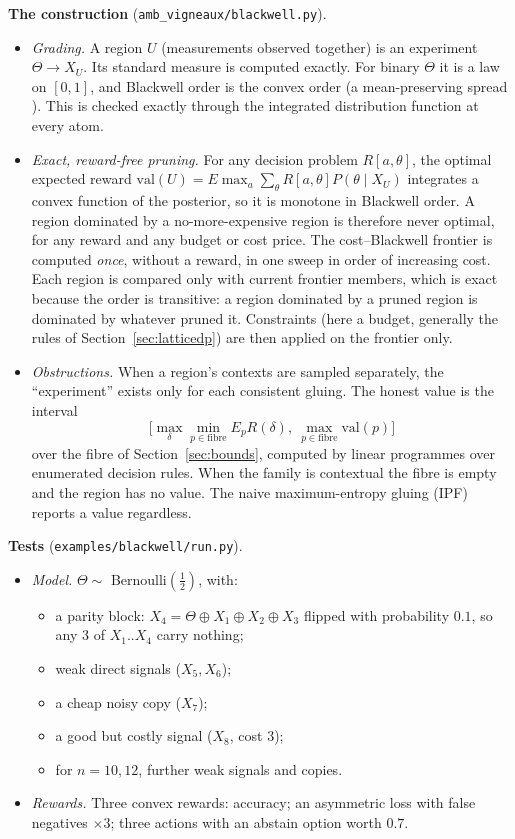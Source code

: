 \documentclass[11pt]{article}
\theoremstyle{definition}
\theoremstyle{remark}
\begin{document}
\textbf{The construction} (\texttt{amb\_vigneaux/blackwell.py}).
\begin{itemize}
  \item \emph{Grading.} A region $U$ (measurements observed together) is an experiment $\Theta\to X_U$. Its standard measure is computed exactly. For binary $\Theta$ it is a law on $[0,1]$, and Blackwell order is the convex order (a mean-preserving spread \cite{rothschildstiglitz70}). This is checked exactly through the integrated distribution function at every atom.
  \item \emph{Exact, reward-free pruning.} For any decision problem $R[a,\theta]$, the optimal expected reward $\mathrm{val}(U)=E\max_a\sum_\theta R[a,\theta]P(\theta\mid X_U)$ integrates a convex function of the posterior, so it is monotone in Blackwell order. A region dominated by a no-more-expensive region is therefore never optimal, for any reward and any budget or cost price. The cost--Blackwell frontier is computed \emph{once}, without a reward, in one sweep in order of increasing cost. Each region is compared only with current frontier members, which is exact because the order is transitive: a region dominated by a pruned region is dominated by whatever pruned it. Constraints (here a budget, generally the rules of Section~\ref{sec:latticedp}) are then applied on the frontier only.
  \item \emph{Obstructions.} When a region's contexts are sampled separately, the ``experiment'' exists only for each consistent gluing. The honest value is the interval
  \[ \bigl[\max_\delta\min_{p\in\text{fibre}}E_p R(\delta),\ \max_{p\in\text{fibre}}\mathrm{val}(p)\bigr] \]
  over the fibre of Section~\ref{sec:bounds}, computed by linear programmes over enumerated decision rules. When the family is contextual the fibre is empty and the region has no value. The naive maximum-entropy gluing (IPF) reports a value regardless.
\end{itemize}

\textbf{Tests} (\texttt{examples/blackwell/run.py}).
\begin{itemize}
  \item \emph{Model.} $\Theta\sim$ Bernoulli$(\tfrac12)$, with:
  \begin{itemize}
    \item a parity block: $X_4=\Theta\oplus X_1\oplus X_2\oplus X_3$ flipped with probability $0.1$, so any $3$ of $X_1..X_4$ carry nothing;
    \item weak direct signals ($X_5,X_6$);
    \item a cheap noisy copy ($X_7$);
    \item a good but costly signal ($X_8$, cost $3$);
    \item for $n=10,12$, further weak signals and copies.
  \end{itemize}
  \item \emph{Rewards.} Three convex rewards: accuracy; an asymmetric loss with false negatives $\times3$; three actions with an abstain option worth $0.7$.
\end{itemize}
\end{document}
